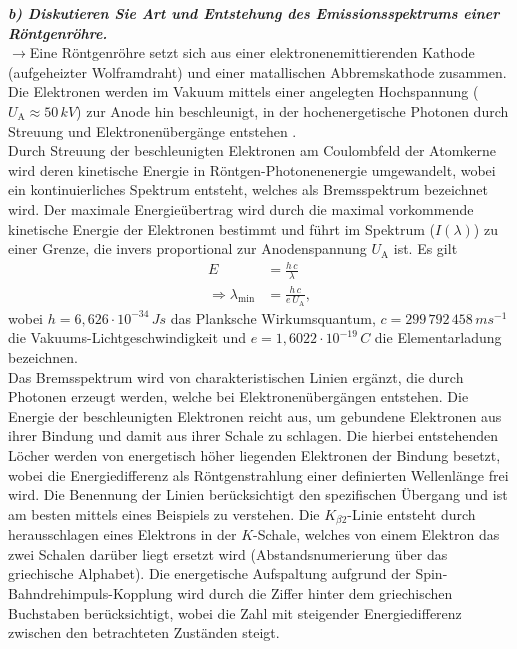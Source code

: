 \textbf{\textit{b) Diskutieren Sie Art und Entstehung des Emissionsspektrums einer 
Röntgenröhre.}}\\
$\rightarrow$Eine Röntgenröhre setzt sich aus einer elektronenemittierenden Kathode (aufgeheizter Wolframdraht) und einer 
matallischen Abbremskathode zusammen. Die Elektronen werden im Vakuum mittels einer angelegten Hochspannung 
($U_{\text{A}}\approx 50\,\si{kV}$)
zur Anode hin beschleunigt, in der hochenergetische Photonen durch Streuung und Elektronenübergänge entstehen \cite{Kristall}. \\
Durch Streuung der beschleunigten Elektronen am Coulombfeld der Atomkerne wird deren 
kinetische Energie in Röntgen-Photonenenergie umgewandelt, wobei ein kontinuierliches Spektrum entsteht, welches 
als Bremsspektrum bezeichnet wird. Der maximale Energieübertrag wird durch die maximal vorkommende kinetische 
Energie der Elektronen bestimmt und führt im Spektrum ($I(\lambda)$) zu einer Grenze, die invers proportional
zur Anodenspannung $U_{\text{A}}$ ist. Es gilt
\begin{align}
    E &= \frac{h\,c}{\lambda} \\
    \Rightarrow \lambda_{\text{min}} &= \frac{h\,c}{e\,U_{\text{A}}}, \label{eq:minlam}
\end{align}
wobei $h = 6,626\cdot 10^{-34}\,\si{Js}$ das Planksche Wirkumsquantum, $c = 299\,792\,458\,\si{ms^{-1}}$ die Vakuums-Lichtgeschwindigkeit
und $e = 1,6022\cdot 10^{-19}\,\si{C}$ die Elementarladung bezeichnen. \\
Das Bremsspektrum wird von charakteristischen Linien ergänzt, die durch Photonen erzeugt werden, welche bei 
Elektronenübergängen entstehen. Die Energie der beschleunigten Elektronen reicht aus, um gebundene Elektronen 
aus ihrer Bindung und damit aus ihrer Schale zu schlagen. Die hierbei entstehenden Löcher werden von energetisch 
höher liegenden Elektronen der Bindung besetzt, wobei die Energiedifferenz als Röntgenstrahlung einer definierten 
Wellenlänge frei wird. Die Benennung der Linien berücksichtigt den spezifischen Übergang und ist 
am besten mittels eines Beispiels zu verstehen. Die $K_{\beta 2}$-Linie entsteht durch herausschlagen 
eines Elektrons in der $K$-Schale, welches von einem Elektron das zwei Schalen darüber liegt ersetzt wird  
(Abstandsnumerierung über das griechische Alphabet). Die energetische Aufspaltung aufgrund der 
Spin-Bahndrehimpuls-Kopplung wird durch die Ziffer hinter dem griechischen Buchstaben berücksichtigt,  
wobei die Zahl mit steigender Energiedifferenz zwischen den betrachteten Zuständen steigt. \\
